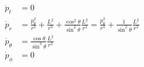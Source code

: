 \begin{align*}
\dot{p}_t &= 0\\
\dot{p}_r &= \frac{p_\theta^2}{r^3} + \frac{L^2}{r^3} + \frac{\cos^2 \theta}{\sin^2 \theta} \frac{L^2}{r^3} 
          = \frac{p_\theta^2}{r^3} + \frac{1}{\sin^2 \theta} \frac{L^2}{r^3}\\
\dot{p}_\theta &= \frac{\cos \theta}{\sin^3 \theta} \frac{L^2}{r^2}\\
\dot{p}_\phi &= 0\\	
\end{align*}
